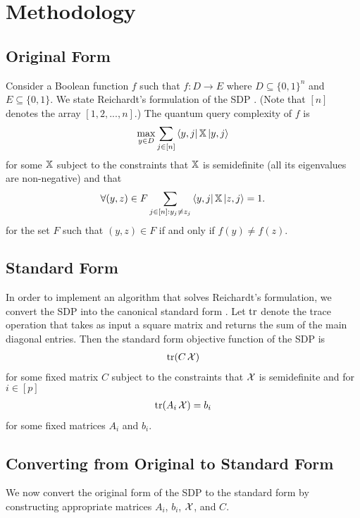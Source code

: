 \section{Methodology}\label{sec:method}

\subsection{Original Form}
Consider a Boolean function $f$ such that
$f: D \rightarrow E$ where 
$D \subseteq {\{0,1\}}^n$ and $E \subseteq {\{0,1\}}$.
We state Reichardt's formulation of the SDP \cite{reichardt2009span}.
(Note that $[n]$ denotes the array
$[1,2,...,n]$.)
The quantum query complexity of $f$ is
\begin{align} \label{Eq:reichardt_obj} 
    \max_{y \in D} \sum_{j \in [n]} \bra{y,j}\operatorname{\mathbb{X}}\ket{y,j} 
\end{align}
for some $\operatorname{\mathbb{X}}$ subject to the constraints that $\operatorname{\mathbb{X}}$ is semidefinite
(all its eigenvalues are non-negative)
and that
\begin{align}\label{Eq:reichardt_F0}
    \forall (y,z) \in F \sum_{j \in [n]: y_j \ne z_j} 
    \bra{y,j} \operatorname{\mathbb{X}} \ket{z, j} = 1.
\end{align}
for the set $F$ such that $(y,z) \in F$ if and only if
$f(y) \neq f(z)$.

\subsection{Standard Form}
In order to implement an algorithm that solves 
Reichardt's formulation, we convert the SDP
into the canonical standard form
\cite{boyd2004convex}.
Let $\operatorname{\text{tr}}$ denote the trace operation
that takes as input a square matrix
and returns the sum of the main diagonal entries.
Then the standard form objective function of the SDP is
\begin{align}\label{Eq:boyd_obj}
    \operatorname{\text{tr}}(C\operatorname{\mathcal{X}})
\end{align}
for some fixed matrix $C$ subject to the constraints
that $\operatorname{\mathcal{X}}$ is semidefinite and for $i \in [p]$
\begin{align} \label{Eq:boyd_trace}
    \operatorname{\text{tr}}(A_i \operatorname{\mathcal{X}}) = b_i
\end{align}
for some fixed matrices $A_i$ and $b_i$.

\subsection{Converting from Original to Standard Form}
We now convert the original form of the SDP to
the standard form by constructing appropriate matrices $A_i$, $b_i$, $\operatorname{\mathcal{X}}$, and $C$.

